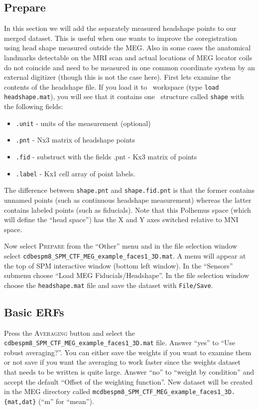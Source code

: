 \subsection{Prepare}

In this section we will add the separately measured headshape points to our merged dataset. This is useful when one wants to improve the coregistration using head shape measured outside the MEG. Also in some cases the anatomical landmarks detectable on the MRI scan and actual locations of MEG locator coils do not coincide and need to be measured in one common coordinate system by an external digitizer (though this is not the case here). First lets examine the contents of the headshape file. If you load it to \matlab\ workspace (type \texttt{load headshape.mat}), you will see that it contains one \matlab\ structure called \texttt{shape} with the following fields:
\begin{itemize}
\item \texttt{.unit} - units of the measurement (optional)
\item \texttt{.pnt} - Nx3 matrix of headshape points
\item \texttt{.fid} - substruct with the fields .pnt - Kx3 matrix of points
\item \texttt{.label} - Kx1 cell array of point labels.
\end{itemize}

The difference between \texttt{shape.pnt} and \texttt{shape.fid.pnt} is that the former contains unnamed points (such as continuous headshape measurement) whereas the latter contains labeled points (such as fiducials). Note that this Polhemus space (which will define the ``head space'') has the X and Y axes switched relative to MNI space.

Now select \textsc{Prepare} from the ``Other'' menu and in the file selection window select \texttt{cdbespm8\_\-SPM\_\-CTF\_\-MEG\_\-example\_\-faces1\_3D.mat}. A menu will appear at the top of SPM interactive window (bottom left window). In the ``Sensors'' submenu choose ``Load MEG Fiducials/Headshape''. In the file selection window choose the \texttt{headshape.mat} file and save the dataset with \texttt{File/Save}.

\subsection{Basic ERFs} 

Press the \textsc{Averaging} button and select the \texttt{cdbespm8\_SPM\_CTF\_MEG\_example\_faces1\_3D.mat} file. Answer ``yes'' to ``Use robust averaging?''. You can either save the weights if you want to examine them or not save if you want the averaging to work faster since the weights dataset that needs to be written is quite large. Answer ``no'' to ``weight by condition'' and accept the default ``Offset of the weighting function''. New dataset will be created in the MEG directory called \texttt{mcdbespm8\_SPM\_CTF\_MEG\_example\_faces1\_3D.\{mat,dat\}} (``m'' for ``mean'').

